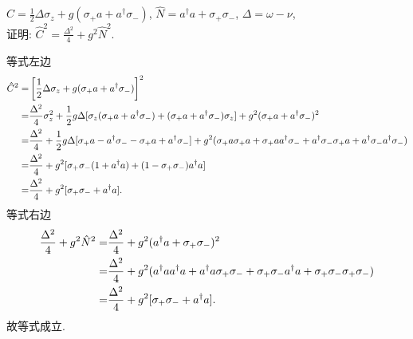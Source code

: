 \documentclass{assignment}
\begin{document}
\begin{prob}
    $\hat{C}=\frac{1}{2}\Delta\sigma_z+g(\sigma_+a+a^{\dagger}\sigma_-)$, $\hat{N}=a^{\dagger}a+\sigma_+\sigma_-$, $\Delta=\omega-\nu$,\\
    证明: $\hat{C}^2=\frac{\Delta^2}{4}+g^2\hat{N}^2$.
\end{prob}
\begin{pf}
    等式左边
    \begin{align}
        \notag\hat{C}^2=&\left[\frac{1}{2}\Delta\sigma_z+g(\sigma_+a+a^{\dagger}\sigma_-)\right]^2\\
        \notag=&\frac{\Delta^2}{4}\sigma_z^2+\frac{1}{2}g\Delta[\sigma_z(\sigma_+a+a^{\dagger}\sigma_-)+(\sigma_+a+a^{\dagger}\sigma_-)\sigma_z]+g^2(\sigma_+a+a^{\dagger}\sigma_-)^2\\
        \notag=&\frac{\Delta^2}{4}+\frac{1}{2}g\Delta[\sigma_+a-a^{\dagger}\sigma_--\sigma_+a+a^{\dagger}\sigma_-]+g^2(\sigma_+a\sigma_+a+\sigma_+aa^{\dagger}\sigma_-+a^{\dagger}\sigma_-\sigma_+a+a^{\dagger}\sigma_-a^{\dagger}\sigma_-)\\
        \notag=&\frac{\Delta^2}{4}+g^2[\sigma_+\sigma_-(1+a^{\dagger}a)+(1-\sigma_+\sigma_-)a^{\dagger}a]\\
        =&\frac{\Delta^2}{4}+g^2[\sigma_+\sigma_-+a^{\dagger}a].
    \end{align}
    等式右边
    \begin{align}
        \notag\frac{\Delta^2}{4}+g^2\hat{N}^2=&\frac{\Delta^2}{4}+g^2(a^{\dagger}a+\sigma_+\sigma_-)^2\\
        \notag=&\frac{\Delta^2}{4}+g^2(a^{\dagger}aa^{\dagger}a+a^{\dagger}a\sigma_+\sigma_-+\sigma_+\sigma_-a^{\dagger}a+\sigma_+\sigma_-\sigma_+\sigma_-)\\
        =&\frac{\Delta^2}{4}+g^2[\sigma_+\sigma_-+a^{\dagger}a].
    \end{align}
    故等式成立.
\end{pf}
\end{document}
